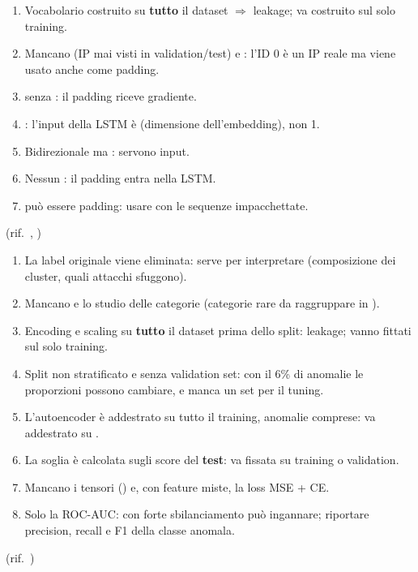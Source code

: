 \begin{soluzione}
\begin{enumerate}
  \item Vocabolario costruito su \textbf{tutto} il dataset $\Rightarrow$ leakage; va costruito sul solo training.
  \item Mancano  (IP mai visti in validation/test) e : l'ID 0 è un IP reale ma viene usato anche come padding.
  \item {} senza : il padding riceve gradiente.
  \item {}: l'input della LSTM è  (dimensione dell'embedding), non 1.
  \item Bidirezionale ma : servono  input.
  \item Nessun : il padding entra nella LSTM.
  \item {} può essere padding: usare  con le sequenze impacchettate.
\end{enumerate}

(rif.\ , )
\end{soluzione}

\begin{soluzione}
\begin{enumerate}
  \item La label originale viene eliminata: serve per interpretare (composizione dei cluster, quali attacchi sfuggono).
  \item Mancano  e lo studio delle categorie (categorie rare da raggruppare in ).
  \item Encoding e scaling su \textbf{tutto} il dataset prima dello split: leakage; vanno fittati sul solo training.
  \item Split non stratificato e senza validation set: con il 6\% di anomalie le proporzioni possono cambiare, e manca un set per il tuning.
  \item L'autoencoder è addestrato su tutto il training, anomalie comprese: va addestrato su .
  \item La soglia è calcolata sugli score del \textbf{test}: va fissata su training o validation.
  \item Mancano i tensori () e, con feature miste, la loss MSE + CE.
  \item Solo la ROC-AUC: con forte sbilanciamento può ingannare; riportare precision, recall e F1 della classe anomala.
\end{enumerate}

(rif.\ )
\end{soluzione}

